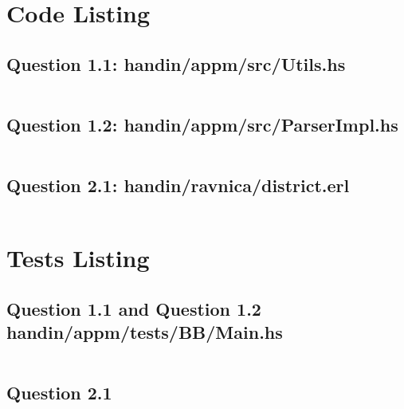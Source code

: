 \documentclass[11pt,a4paper]{article}
\begin{document}




\appendix
\section{Code Listing}
\subsection{Question 1.1: handin/appm/src/Utils.hs}
\label{appendix:question1-1}
\inputminted{haskell}{handin/appm/src/Utils.hs}
\subsection{Question 1.2: handin/appm/src/ParserImpl.hs}
\label{appendix:question1-2}
\inputminted{haskell}{handin/appm/src/ParserImpl.hs}
\subsection{Question 2.1: handin/ravnica/district.erl}
\inputminted{erlang}{handin/ravnica/district.erl}
\label{appendix:question2-1}

\section{Tests Listing}
\subsection{Question 1.1 and Question 1.2 handin/appm/tests/BB/Main.hs}
\inputminted{haskell}{handin/appm/tests/BB/Main.hs}
\subsection{Question 2.1}
\inputminted{erlang}{handin/ravnica/district_tests.erl}
\label{appendix:tests}
\end{document}
